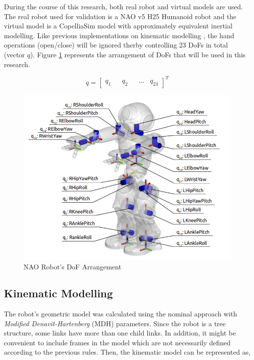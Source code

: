 During the course of this research, both real robot and virtual models are used. The real robot used for validation is
a NAO v5 H25 Humanoid robot and the virtual model is a CopelliaSim model with approximately equivalent inertial modelling.
Like previous implementations on kinematic modelling \cite{louisepouble}, the hand operations (open/close) will be ignored therby
controlling 23 DoFs in total (vector $q$). Figure \ref{fig: nao-robot-joint} represents the arrangement of DoFs that will be used in this research.

\begin{equation*}
    q = \begin{bmatrix}
        q_1 && q_2 && ... & q_{23}
    \end{bmatrix}^T
\end{equation*}
\begin{figure}[h!]
    \centering
    \includegraphics[scale=0.55]{images/nao-robot-joint.png}\hfill
    \caption{NAO Robot's DoF Arrangement \cite{louisepouble}}\hfill
    \label{fig: nao-robot-joint}
\end{figure}

\subsection{Kinematic Modelling}

The robot's geometric model was calculated using the nominal approach with \textit{Modified Denavit-Hartenberg} (MDH) parameters. Since the 
robot is a tree structure, some links have more than one child links. In addition, it might be convenient to include 
frames in the model which are not necessarily defined according to the previous rules. Then, the kinematic model can be represented as,

